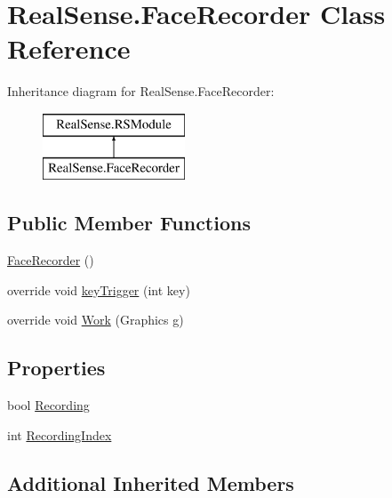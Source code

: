 \hypertarget{class_real_sense_1_1_face_recorder}{}\section{Real\+Sense.\+Face\+Recorder Class Reference}
\label{class_real_sense_1_1_face_recorder}
Inheritance diagram for Real\+Sense.\+Face\+Recorder\+:\begin{figure}[H]
\begin{center}
\leavevmode
\includegraphics[height=2.000000cm]{class_real_sense_1_1_face_recorder}
\end{center}
\end{figure}
\subsection*{Public Member Functions}
\begin{DoxyCompactItemize}
\item 
\hyperlink{class_real_sense_1_1_face_recorder_a782589b2a536a93d548f1efab49c6bcd}{Face\+Recorder} ()
\item 
override void \hyperlink{class_real_sense_1_1_face_recorder_aedf8a394ed84e2e4c3d82d050e457542}{key\+Trigger} (int key)
\item 
override void \hyperlink{class_real_sense_1_1_face_recorder_a2adae8c9db76fe9617e99795b4fa5e0e}{Work} (Graphics g)
\end{DoxyCompactItemize}
\subsection*{Properties}
\begin{DoxyCompactItemize}
\item 
bool \hyperlink{class_real_sense_1_1_face_recorder_a3dd841901321c20b2bba9067fc67bddd}{Recording}
\item 
int \hyperlink{class_real_sense_1_1_face_recorder_a4f1a094d0321d299feb5aa0e3553b506}{Recording\+Index}
\end{DoxyCompactItemize}
\subsection*{Additional Inherited Members}



